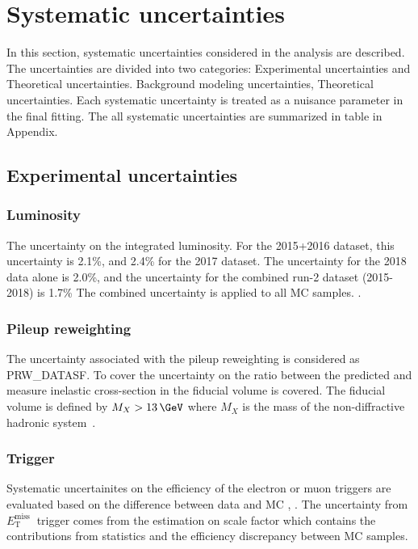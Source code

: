 \chapter{Systematic uncertainties}
In this section, systematic uncertainties considered in the analysis are described. The uncertainties are divided into two categories:
Experimental uncertainties and Theoretical uncertainties.
Background modeling uncertainties, Theoretical uncertainties. 
Each systematic uncertainty is treated as a nuisance parameter in the final fitting.
The all systematic uncertainties are summarized in table in Appendix.

\section{Experimental uncertainties}

\subsection{Luminosity}
The uncertainty on the integrated luminosity. 
For the 2015+2016 dataset, this uncertainty is 2.1\%, and 2.4\% for the 2017 dataset. The uncertainty for the 2018 data alone is 2.0\%, and the uncertainty for the combined run-2 dataset (2015-2018) is 1.7\% The combined uncertainty is applied to all MC samples. \cite{AtlasLumiRun2}.
\subsection{Pileup reweighting}
The uncertainty associated with the pileup reweighting is considered\cite{ExtendedPileupReweighting} as PRW\_DATASF. To cover the uncertainty on the ratio between the predicted and measure inelastic cross-section in the fiducial volume is covered. The fiducial volume is defined by $M_X > 13\,\GeV$ where $M_X$ is the mass of the non-diffractive hadronic system~\cite{STDM-2015-05}.
\subsection{Trigger}
Systematic uncertainites on the efficiency of the electron or muon triggers are evaluated based on the difference between data and MC \cite{PERF-2016-01}, \cite{MUON-2018-03}. The uncertainty from $E_{\mathrm{T}}^{\text {miss }}$ trigger comes from the estimation on scale factor which contains the contributions from statistics and the efficiency discrepancy between MC samples.
